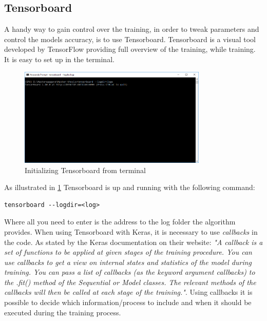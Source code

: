 \documentclass[USenglish]{ifimaster}  %
\begin{document}
\subsection{Tensorboard}
A handy way to gain control over the training, in order to tweak parameters and control the models accuracy, is to use Tensorboard. Tensorboard is a visual tool developed by TensorFlow providing full overview of the training, while training. It is easy to set up in the terminal.
\begin{figure}[ht]
    \centering
    \includegraphics[width=0.8\textwidth]{bilder/tensorboard_anaconda_prompt.PNG}
    \caption{Initializing Tensorboard from terminal}
    \label{fig:tensorboard_anaconda_prompt}
\end{figure}
\newline
As illustrated in \cref{fig:tensorboard_anaconda_prompt} Tensorboard is up and running with the following command: 

\begin{verbatim}
tensorboard --logdir=<log> 
\end{verbatim}
Where all you need to enter is the address to the log folder the algorithm provides. 
\newline
When using Tensorboard with Keras, it is necessary to use \textit{callbacks} in the code. As stated by the Keras documentation on their website:
\newline
\newline
\textit{"A callback is a set of functions to be applied at given stages of the training procedure. You can use callbacks to get a view on internal states and statistics of the model during training. You can pass a list of callbacks (as the keyword argument callbacks) to the .fit() method of the Sequential or Model classes. The relevant methods of the callbacks will then be called at each stage of the training."}\cite{website:Keras_doc}. 
\newline
\newline
Using callbacks it is possible to decide which information/process to include and when it should be executed during the training process.
\end{document}
